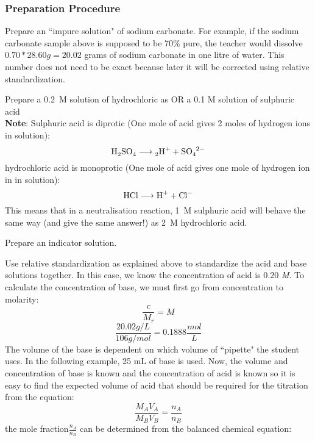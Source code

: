 \subsubsection{Preparation Procedure}
\begin{enumerate}
\item{Prepare an ``impure solution" of sodium carbonate. For example, if the sodium carbonate sample above is supposed to be 70\% pure, the teacher would dissolve $0.70*28.60g=20.02$ grams of sodium carbonate in one litre of water.  This number does not need to be exact because later it will be corrected using relative standardization.}
\item{Prepare a 0.2~M solution of hydrochloric as OR a 0.1 M solution of sulphuric acid\\
\textbf{Note}: Sulphuric acid is diprotic (One mole of acid gives 2 moles of hydrogen ions in solution):
$$\ce{H2SO4 \longrightarrow 2H^{+} + SO4^{2-}}$$
 hydrochloric acid is monoprotic (One mole of acid gives one mole of hydrogen ion in in solution):
 $$\ce{HCl \longrightarrow H^{+} + Cl^{-}}$$
 This means that in a neutralisation reaction, 1~M sulphuric acid will behave the same way (and give the same answer!) as 2~M hydrochloric acid.
\item{Prepare an indicator solution.}
\item{Use relative standardization as explained above to standardize the acid and base solutions together. In this case, we know the concentration of acid is 0.20} \textit{M}. To calculate the concentration of base, we must first go                                                                                                                                                                                                                                                                                                                                                                                                         from concentration to molarity: 
$$\frac{c}{M_r}=M$$
$$\frac{20.02 g/L}{106g/mol}=0.1888\frac{mol}{L}$$
The volume of the base is dependent on which volume of ``pipette" the student uses. In the following example, 25 mL of base is used. Now, the volume and concentration of base is known and the concentration of acid is known so it is easy to find the expected volume of acid that should be required for the titration from the equation:
$$\frac{M_A V_A}{M_B V_B}=\frac{n_A}{n_B}$$
the mole fraction$\frac{n_A}{n_B}$  can be determined from the balanced chemical equation: 
\begin{center}

\end{center}}
\end{enumerate}
